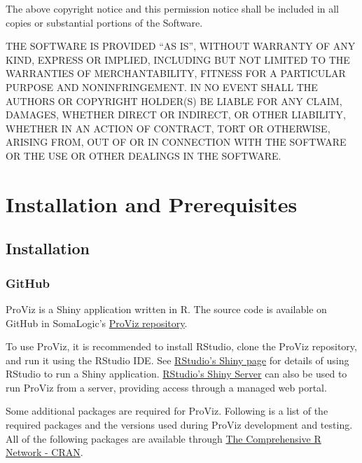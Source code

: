 \documentclass[
]{book}
\begin{document}
The above copyright notice and this permission notice shall be included in all copies or substantial portions of the Software.

THE SOFTWARE IS PROVIDED ``AS IS'', WITHOUT WARRANTY OF ANY KIND, EXPRESS OR IMPLIED, INCLUDING BUT NOT LIMITED TO THE WARRANTIES OF MERCHANTABILITY, FITNESS FOR A PARTICULAR PURPOSE AND NONINFRINGEMENT. IN NO EVENT SHALL THE AUTHORS OR COPYRIGHT HOLDER(S) BE LIABLE FOR ANY CLAIM, DAMAGES, WHETHER DIRECT OR INDIRECT, OR OTHER LIABILITY, WHETHER IN AN ACTION OF CONTRACT, TORT OR OTHERWISE, ARISING FROM, OUT OF OR IN CONNECTION WITH THE SOFTWARE OR THE USE OR OTHER DEALINGS IN THE SOFTWARE.

\hypertarget{installation-and-prerequisites}{%
\chapter{Installation and Prerequisites}\label{installation-and-prerequisites}}

\hypertarget{installation}{%
\section{Installation}\label{installation}}

\hypertarget{github}{%
\subsection{GitHub}\label{github}}

ProViz is a Shiny application written in R. The source code is available on GitHub in SomaLogic's \href{https://github.com/SomaLogic/ProViz}{ProViz repository}.

To use ProViz, it is recommended to install RStudio, clone the ProViz repository, and run it using the RStudio IDE. See \href{https://shiny.rstudio.com/}{RStudio's Shiny page} for details of using RStudio to run a Shiny application. \href{https://rstudio.com/products/shiny/shiny-server/}{RStudio's Shiny Server} can also be used to run ProViz from a server, providing access through a managed web portal.

Some additional packages are required for ProViz. Following is a list of the required packages and the versions used during ProViz development and testing. All of the following packages are available through \href{https://cran.r-project.org/}{The Comprehensive R Network - CRAN}.
\end{document}
